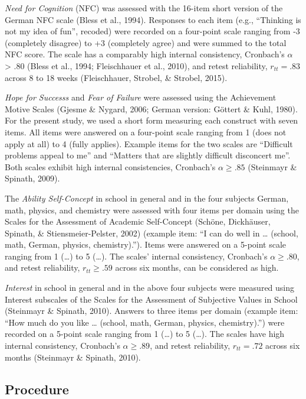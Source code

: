 \documentclass[
  man]{apa6}
\begin{document}
\emph{Need for Cognition} (NFC) was assessed with the 16-item short version of the German NFC scale (Bless et al., 1994). Responses to each item (e.g., ``Thinking is not my idea of fun'', recoded) were recorded on a four-point scale ranging from -3 (completely disagree) to +3 (completely agree) and were summed to the total NFC score. The scale has a comparably high internal consistency, Cronbach's \(\alpha\) \textgreater{} .80 (Bless et al., 1994; Fleischhauer et al., 2010), and retest reliability, \(r_{tt} = .83\) across 8 to 18 weeks (Fleischhauer, Strobel, \& Strobel, 2015).

\emph{Hope for Successs} and \emph{Fear of Failure} were assessed using the Achievement Motive Scales (Gjesme \& Nygard, 2006; German version: Göttert \& Kuhl, 1980). For the present study, we used a short form measuring each construct with seven items. All items were answered on a four-point scale ranging from 1 (does not apply at all) to 4 (fully applies). Example items for the two scales are ``Difficult problems appeal to me'' and ``Matters that are slightly difficult disconcert me''. Both scales exhibit high internal consistencies, Cronbach's \(\alpha\ge.85\) (Steinmayr \& Spinath, 2009).

The \emph{Ability Self-Concept} in school in general and in the four subjects German, math, physics, and chemistry were assessed with four items per domain using the Scales for the Assessment of Academic Self-Concept (Schöne, Dickhäuser, Spinath, \& Stiensmeier-Pelster, 2002) (example item: ``I can do well in \ldots{} (school, math, German, physics, chemistry).''). Items were answered on a 5-point scale ranging from 1 (\ldots{}) to 5 (\ldots{}). The scales' internal consistency, Cronbach's \(\alpha\ge.80\), and retest reliability, \(r_{tt}\ge.59\) across six months, can be considered as high.

\emph{Interest} in school in general and in the above four subjects were measured using Interest subscales of the Scales for the Assessment of Subjective Values in School (Steinmayr \& Spinath, 2010). Answers to three items per domain (example item: ``How much do you like \ldots{} (school, math, German, physics, chemistry).'') were recorded on a 5-point scale ranging from 1 (\ldots{}) to 5 (\ldots{}). The scales have high internal consistency, Cronbach's \(\alpha\ge.89\), and retest reliability, \(r_{tt} = .72\) across six months (Steinmayr \& Spinath, 2010).

\hypertarget{procedure}{%
\subsection{Procedure}\label{procedure}}
\end{document}
